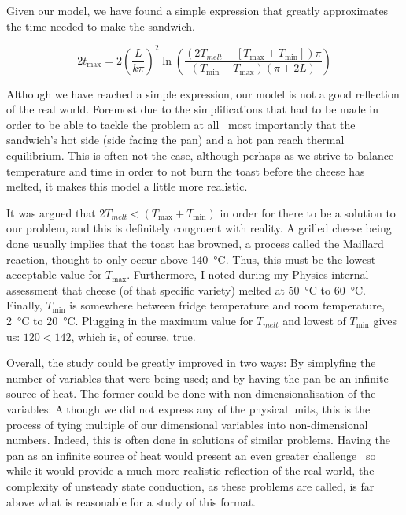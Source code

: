 Given our model, we have found a simple expression that greatly approximates the time needed to make the sandwich.

\begin{equation*}
    2t_{\max} = 2\left(\frac{L}{k\pi}\right)^2 \ln \left( \frac{(2T_{melt} - [T_{\max} +T_{\min}])\pi }{(T_{\min} - T_{\max})(\pi + 2L)} \right)
\end{equation*}

Although we have reached a simple expression, our model is not a good reflection of the real world. 
Foremost due to the simplifications that had to be made in order to be able to tackle the problem at all \textendash\ most importantly that the sandwich's hot side (side facing the pan) and a hot pan reach thermal equilibrium. 
This is often not the case, although perhaps as we strive to balance temperature and time in order to not burn the toast before the cheese has melted, it makes this model a little more realistic.

It was argued that $2T_{melt} < (T_{\max} + T_{\min})$ in order for there to be a solution to our problem, and this is definitely congruent with reality. 
A grilled cheese being done usually implies that the toast has browned, a process called the Maillard reaction, thought to only occur above \SI{140}{\celsius}. 
Thus, this must be the lowest acceptable value for $T_{\max}$. 
Furthermore, I noted during my Physics internal assessment that cheese (of that specific variety) melted at \SI{50}{\celsius} to \SI{60}{\celsius}. 
Finally, $T_{\min}$ is somewhere between fridge temperature and room temperature, \SI{2}{\celsius} to \SI{20}{\celsius}. 
Plugging in the maximum value for $T_{melt}$ and lowest of $T_{\min}$ gives us: $120 < 142$, which is, of course, true.

Overall, the study could be greatly improved in two ways: 
By simplyfing the number of variables that were being used; and by having the pan be an infinite source of heat. 
The former could be done with non-dimensionalisation of the variables: 
Although we did not express any of the physical units, this is the process of tying multiple of our dimensional variables into non-dimensional numbers. 
Indeed, this is often done in solutions of similar problems. 
Having the pan as an infinite source of heat would present an even greater challenge \textendash\ so while it would provide a much more realistic reflection of the real world, the complexity of unsteady state conduction, as these problems are called, is far above what is reasonable for a study of this format.
